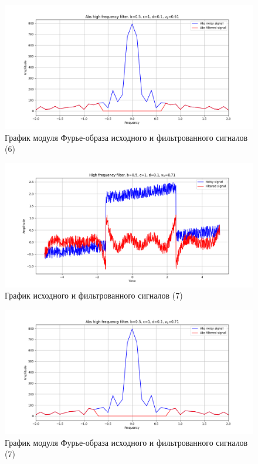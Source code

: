 \documentclass[a4paper, 12pt]{article}
\begin{document}
    \begin{figure}[!htb]
        \centering
        \includegraphics[scale=0.48]{6_abs_u_U_nolow.png}
        \captionsetup{skip=0pt}
        \caption{График модуля Фурье-образа исходного и фильтрованного сигналов (6)}
        \label{fig:fig38}
    \end{figure}
    \begin{figure}[!htb]
        \centering
        \includegraphics[scale=0.48]{7_u_flt_u_nolow.png}
        \captionsetup{skip=0pt}
        \caption{График исходного и фильтрованного сигналов (7)}
        \label{fig:fig39}
    \end{figure}
    \begin{figure}[!htb]
        \centering
        \includegraphics[scale=0.48]{7_abs_u_U_nolow.png}
        \captionsetup{skip=0pt}
        \caption{График модуля Фурье-образа исходного и фильтрованного сигналов (7)}
        \label{fig:fig40}
    \end{figure}
\end{document}
